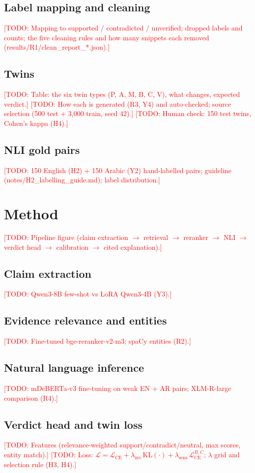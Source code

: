 \documentclass[11pt,a4paper]{article}
\newcommand{\todo}[1]{\textcolor{red}{[TODO: #1]}}
\begin{document}
\subsection{Label mapping and cleaning}
\todo{Mapping to supported / contradicted / unverified; dropped labels and counts;
the five cleaning rules and how many snippets each removed (results/R1/clean\_report\_*.json).}
\subsection{Twins}
\todo{Table: the six twin types (P, A, M, B, C, V), what changes, expected verdict.}
\todo{How each is generated (R3, Y4) and auto-checked; source selection (500 test + 3,000 train, seed 42).}
\todo{Human check: 150 test twins, Cohen's kappa (H4).}
\subsection{NLI gold pairs}
\todo{150 English (H2) + 150 Arabic (Y2) hand-labelled pairs; guideline
(notes/H2\_labelling\_guide.md); label distribution.}

\section{Method}
\label{sec:method}
\todo{Pipeline figure (claim extraction $\rightarrow$ retrieval $\rightarrow$ reranker
$\rightarrow$ NLI $\rightarrow$ verdict head $\rightarrow$ calibration $\rightarrow$ cited explanation).}
\subsection{Claim extraction}
\todo{Qwen3-8B few-shot vs LoRA Qwen3-4B (Y3).}
\subsection{Evidence relevance and entities}
\todo{Fine-tuned bge-reranker-v2-m3; spaCy entities (R2).}
\subsection{Natural language inference}
\todo{mDeBERTa-v3 fine-tuning on weak EN + AR pairs; XLM-R-large comparison (R4).}
\subsection{Verdict head and twin loss}
\todo{Features (relevance-weighted support/contradict/neutral, max scores, entity match).}
\todo{Loss: $\mathcal{L} = \mathcal{L}_{\text{CE}} + \lambda_{\text{inv}}\,\mathrm{KL}(\cdot) + \lambda_{\text{sens}}\,\mathcal{L}_{\text{CE}}^{B,C}$; $\lambda$ grid and selection rule (H3, H4).}
\end{document}
